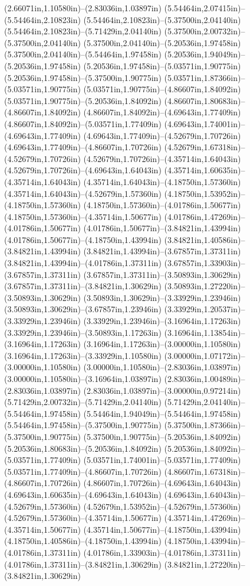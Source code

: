 (2.66071in,1.10580in)--(2.83036in,1.03897in) (5.54464in,2.07415in)--(5.54464in,2.10823in) (5.54464in,2.10823in)--(5.37500in,2.04140in) (5.54464in,2.10823in)--(5.71429in,2.04140in) (5.37500in,2.00732in)--(5.37500in,2.04140in) (5.37500in,2.04140in)--(5.20536in,1.97458in) (5.37500in,2.04140in)--(5.54464in,1.97458in) (5.20536in,1.94049in)--(5.20536in,1.97458in) (5.20536in,1.97458in)--(5.03571in,1.90775in) (5.20536in,1.97458in)--(5.37500in,1.90775in) (5.03571in,1.87366in)--(5.03571in,1.90775in) (5.03571in,1.90775in)--(4.86607in,1.84092in) (5.03571in,1.90775in)--(5.20536in,1.84092in) (4.86607in,1.80683in)--(4.86607in,1.84092in) (4.86607in,1.84092in)--(4.69643in,1.77409in) (4.86607in,1.84092in)--(5.03571in,1.77409in) (4.69643in,1.74001in)--(4.69643in,1.77409in) (4.69643in,1.77409in)--(4.52679in,1.70726in) (4.69643in,1.77409in)--(4.86607in,1.70726in) (4.52679in,1.67318in)--(4.52679in,1.70726in) (4.52679in,1.70726in)--(4.35714in,1.64043in) (4.52679in,1.70726in)--(4.69643in,1.64043in) (4.35714in,1.60635in)--(4.35714in,1.64043in) (4.35714in,1.64043in)--(4.18750in,1.57360in) (4.35714in,1.64043in)--(4.52679in,1.57360in) (4.18750in,1.53952in)--(4.18750in,1.57360in) (4.18750in,1.57360in)--(4.01786in,1.50677in) (4.18750in,1.57360in)--(4.35714in,1.50677in) (4.01786in,1.47269in)--(4.01786in,1.50677in) (4.01786in,1.50677in)--(3.84821in,1.43994in) (4.01786in,1.50677in)--(4.18750in,1.43994in) (3.84821in,1.40586in)--(3.84821in,1.43994in) (3.84821in,1.43994in)--(3.67857in,1.37311in) (3.84821in,1.43994in)--(4.01786in,1.37311in) (3.67857in,1.33903in)--(3.67857in,1.37311in) (3.67857in,1.37311in)--(3.50893in,1.30629in) (3.67857in,1.37311in)--(3.84821in,1.30629in) (3.50893in,1.27220in)--(3.50893in,1.30629in) (3.50893in,1.30629in)--(3.33929in,1.23946in) (3.50893in,1.30629in)--(3.67857in,1.23946in) (3.33929in,1.20537in)--(3.33929in,1.23946in) (3.33929in,1.23946in)--(3.16964in,1.17263in) (3.33929in,1.23946in)--(3.50893in,1.17263in) (3.16964in,1.13854in)--(3.16964in,1.17263in) (3.16964in,1.17263in)--(3.00000in,1.10580in) (3.16964in,1.17263in)--(3.33929in,1.10580in) (3.00000in,1.07172in)--(3.00000in,1.10580in) (3.00000in,1.10580in)--(2.83036in,1.03897in) (3.00000in,1.10580in)--(3.16964in,1.03897in) (2.83036in,1.00489in)--(2.83036in,1.03897in) (2.83036in,1.03897in)--(3.00000in,0.97214in) (5.71429in,2.00732in)--(5.71429in,2.04140in) (5.71429in,2.04140in)--(5.54464in,1.97458in) (5.54464in,1.94049in)--(5.54464in,1.97458in) (5.54464in,1.97458in)--(5.37500in,1.90775in) (5.37500in,1.87366in)--(5.37500in,1.90775in) (5.37500in,1.90775in)--(5.20536in,1.84092in) (5.20536in,1.80683in)--(5.20536in,1.84092in) (5.20536in,1.84092in)--(5.03571in,1.77409in) (5.03571in,1.74001in)--(5.03571in,1.77409in) (5.03571in,1.77409in)--(4.86607in,1.70726in) (4.86607in,1.67318in)--(4.86607in,1.70726in) (4.86607in,1.70726in)--(4.69643in,1.64043in) (4.69643in,1.60635in)--(4.69643in,1.64043in) (4.69643in,1.64043in)--(4.52679in,1.57360in) (4.52679in,1.53952in)--(4.52679in,1.57360in) (4.52679in,1.57360in)--(4.35714in,1.50677in) (4.35714in,1.47269in)--(4.35714in,1.50677in) (4.35714in,1.50677in)--(4.18750in,1.43994in) (4.18750in,1.40586in)--(4.18750in,1.43994in) (4.18750in,1.43994in)--(4.01786in,1.37311in) (4.01786in,1.33903in)--(4.01786in,1.37311in) (4.01786in,1.37311in)--(3.84821in,1.30629in) (3.84821in,1.27220in)--(3.84821in,1.30629in) 